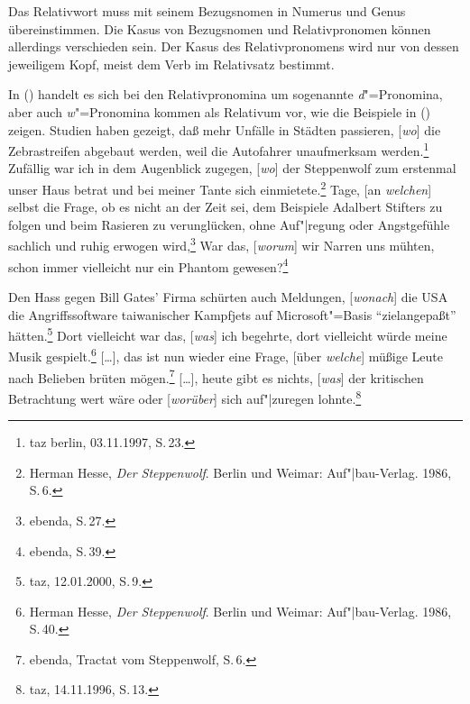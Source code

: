 {Das Relativwort muss mit seinem Bezugsnomen in Numerus und Genus übereinstimmen. Die Kasus von
Bezugsnomen und Relativpronomen können allerdings verschieden sein. Der Kasus des Relativpronomens
wird nur von dessen jeweiligem Kopf, meist dem Verb im Relativsatz bestimmt.

In () handelt es sich bei den Relativpronomina um sogenannte \emph{d}"=Pronomina, aber
auch \emph{w}"=Pronomina kommen als Relativum vor, wie die Beispiele in () zeigen.
\eal
\label{bsp-rs-w-pron}
\ex Studien haben gezeigt, daß mehr Unfälle in Städten passieren, [\emph{wo}] 
      die Zebrastreifen abgebaut werden, weil die Autofahrer unaufmerksam werden.\footnote{
        taz berlin, 03.11.1997, S.\,23.
        }
\ex Zufällig war ich in dem Augenblick zugegen, [\emph{wo}] der Steppenwolf 
      zum erstenmal unser Haus betrat und bei meiner Tante sich einmietete.\footnote{
                Herman Hesse, \emph{Der Steppenwolf}. Berlin und Weimar: Auf"|bau-Verlag. 1986, S.\,6.
	}
\ex Tage, [an \emph{welchen}] selbst die Frage, ob es nicht an der Zeit sei, dem Beispiele
      Adalbert Stifters zu folgen und beim Rasieren zu verunglücken, ohne Auf"|regung
      oder Angstgefühle sachlich und ruhig erwogen wird,\footnote{
		ebenda, S.\,27.
	}
\ex War das, [\emph{worum}] wir Narren uns mühten, schon immer vielleicht nur ein Phantom gewesen?\footnote{
		ebenda, S.\,39.
	}

\ex Den Hass gegen Bill Gates' Firma schürten auch Meldungen, [\emph{wonach}] die USA die Angriffssoftware
      taiwanischer Kampfjets auf Microsoft"=Basis "`ziel\-an\-ge\-paßt"' hätten.\footnote{
        taz, 12.01.2000, S.\,9.
      }
\ex Dort vielleicht war das, [\emph{was}] ich begehrte, dort vielleicht würde meine Musik gespielt.\footnote{
                Herman Hesse, \emph{Der Steppenwolf}. Berlin und Weimar: Auf"|bau-Verlag. 1986, S.\,40.
	}\label{bsp-meine-musik}
\ex {}[\ldots], das ist nun wieder eine Frage, [über \emph{welche}] müßige Leute nach Belieben brüten
	mögen.\footnote{
                ebenda, Tractat vom Steppenwolf, S.\,6.
	} 
\ex {}[\ldots], heute gibt es nichts, [\emph{was}] der kritischen Betrachtung wert wäre oder
      [\emph{wor\-über}] sich auf"|zuregen lohnte.\footnote{
	taz, 14.11.1996, S.\,13.
      }
\zl
{}

}
